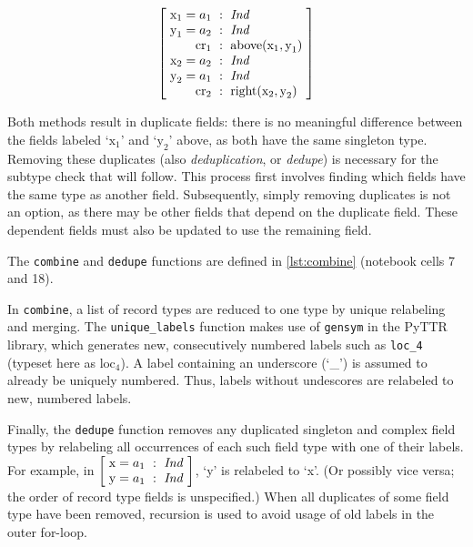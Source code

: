 \begin{equation} \label{eq:combineunconflict}
\rec{
    \text{x}_1=a_1 &:& \type{Ind} \\
    \text{y}_1=a_2 &:& \type{Ind} \\
    \text{cr}_1 &:& \text{above}(\text{x}_1, \text{y}_1) \\
    \text{x}_2=a_2 &:& \type{Ind} \\
    \text{y}_2=a_1 &:& \type{Ind} \\
    \text{cr}_2 &:& \text{right}(\text{x}_2, \text{y}_2)
    }
\end{equation}

Both methods result in duplicate fields: there is no meaningful difference between the fields labeled `$\text{x}_1$' and `$\text{y}_2$' above, as both have the same singleton type.
Removing these duplicates (also \textit{deduplication}, or \textit{dedupe}) is necessary for the subtype check that will follow.
This process first involves finding which fields have the same type as another field.
Subsequently, simply removing duplicates is not an option, as there may be other fields that depend on the duplicate field.
These dependent fields must also be updated to use the remaining field.

The \texttt{combine} and \texttt{dedupe} functions are defined in \autoref{lst:combine} (notebook cells 7 and 18).

In \texttt{combine}, a list of record types are reduced to one type by unique relabeling and merging.
The \texttt{unique\_labels} function makes use of \texttt{gensym} in the PyTTR library, which generates new, consecutively numbered labels such as \texttt{loc\_4} (typeset here as $\text{loc}_4$).
A label containing an underscore (`\_') is assumed to already be uniquely numbered.
Thus, labels without undescores are relabeled to new, numbered labels.

Finally, the \texttt{dedupe} function removes any duplicated singleton and complex field types by relabeling all occurrences of each such field type with one of their labels.
For example, in $\rec{\text{x}=a_1 &:& \type{Ind} \\ \text{y}=a_1 &:& \type{Ind}}$, `y' is relabeled to `x'.
(Or possibly vice versa; the order of record type fields is unspecified.)
When all duplicates of some field type have been removed, recursion is used to avoid usage of old labels in the outer for-loop.

